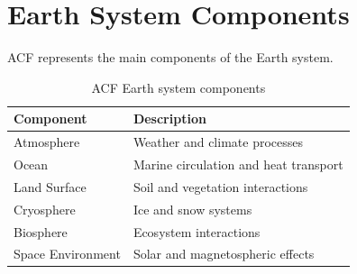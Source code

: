 \section{Earth System Components}


ACF represents the main components of the Earth system.



\begin{table}[h]

\centering

\begin{tabular}{ll}

\toprule

Component & Description \\

\midrule

Atmosphere & Weather and climate processes \\

Ocean & Marine circulation and heat transport \\

Land Surface & Soil and vegetation interactions \\

Cryosphere & Ice and snow systems \\

Biosphere & Ecosystem interactions \\

Space Environment & Solar and magnetospheric effects \\

\bottomrule

\end{tabular}


\caption{ACF Earth system components}

\end{table}


